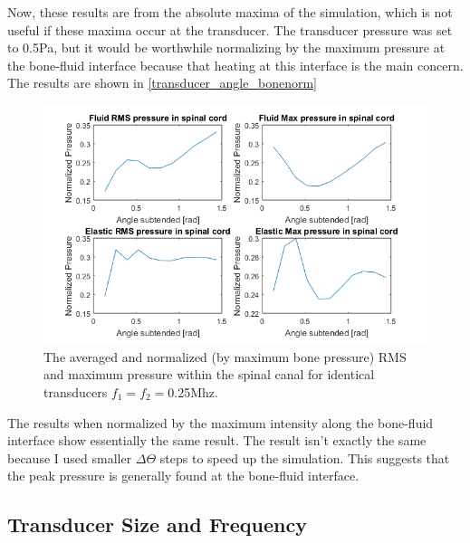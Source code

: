 \documentclass[10pt,a4paper]{article}
\begin{document}
Now, these results are from the absolute maxima of the simulation, which is not useful if these maxima occur at the transducer. The transducer pressure was set to 0.5Pa, but it would be worthwhile normalizing by the maximum pressure at the bone-fluid interface because that heating at this interface is the main concern. The results are shown in \autoref{transducer_angle_bonenorm}
\begin{figure}[H]
\includegraphics[scale=0.8]{transducer_angle_bonenorm}
\caption{The averaged and normalized (by maximum bone pressure) RMS and maximum pressure within the spinal canal for identical transducers $f_1 = f_2 = $0.25Mhz.} \label{transducer_angle_bonenorm}
\end{figure}
The results when normalized by the maximum intensity along the bone-fluid interface show essentially the same result. The result isn't exactly the same because I used smaller $\Delta \Theta$ steps to speed up the simulation. This suggests that the peak pressure is generally found at the bone-fluid interface. 

\subsection*{Transducer Size and Frequency}
\end{document}
